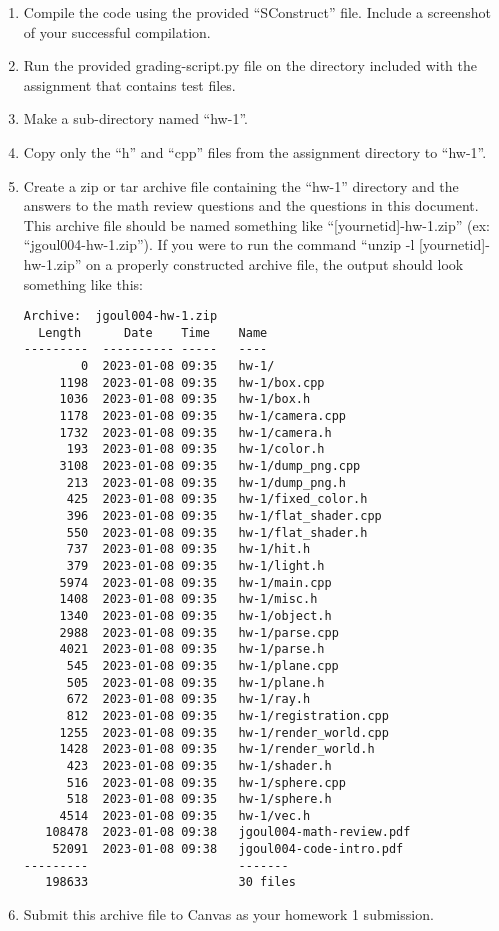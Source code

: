\documentclass[12pt]{article}
\begin{document}
\begin{enumerate}
\item Compile the code using the provided ``SConstruct'' file. Include a screenshot of your successful compilation.
\item Run the provided grading-script.py file on the directory included with the assignment that contains test files.
\item Make a sub-directory named ``hw-1''.
\item Copy only the ``h'' and ``cpp'' files from the assignment directory to ``hw-1''.
\item Create a zip or tar archive file containing the ``hw-1'' directory and the answers to the math review questions and the questions in this document. This archive file should be named something like ``[yournetid]-hw-1.zip'' (ex: ``jgoul004-hw-1.zip''). If you were to run the command ``unzip -l [yournetid]-hw-1.zip'' on a properly constructed archive file, the output should look something like this:
\begin{verbatim}
Archive:  jgoul004-hw-1.zip
  Length      Date    Time    Name
---------  ---------- -----   ----
        0  2023-01-08 09:35   hw-1/
     1198  2023-01-08 09:35   hw-1/box.cpp
     1036  2023-01-08 09:35   hw-1/box.h
     1178  2023-01-08 09:35   hw-1/camera.cpp
     1732  2023-01-08 09:35   hw-1/camera.h
      193  2023-01-08 09:35   hw-1/color.h
     3108  2023-01-08 09:35   hw-1/dump_png.cpp
      213  2023-01-08 09:35   hw-1/dump_png.h
      425  2023-01-08 09:35   hw-1/fixed_color.h
      396  2023-01-08 09:35   hw-1/flat_shader.cpp
      550  2023-01-08 09:35   hw-1/flat_shader.h
      737  2023-01-08 09:35   hw-1/hit.h
      379  2023-01-08 09:35   hw-1/light.h
     5974  2023-01-08 09:35   hw-1/main.cpp
     1408  2023-01-08 09:35   hw-1/misc.h
     1340  2023-01-08 09:35   hw-1/object.h
     2988  2023-01-08 09:35   hw-1/parse.cpp
     4021  2023-01-08 09:35   hw-1/parse.h
      545  2023-01-08 09:35   hw-1/plane.cpp
      505  2023-01-08 09:35   hw-1/plane.h
      672  2023-01-08 09:35   hw-1/ray.h
      812  2023-01-08 09:35   hw-1/registration.cpp
     1255  2023-01-08 09:35   hw-1/render_world.cpp
     1428  2023-01-08 09:35   hw-1/render_world.h
      423  2023-01-08 09:35   hw-1/shader.h
      516  2023-01-08 09:35   hw-1/sphere.cpp
      518  2023-01-08 09:35   hw-1/sphere.h
     4514  2023-01-08 09:35   hw-1/vec.h
   108478  2023-01-08 09:38   jgoul004-math-review.pdf
    52091  2023-01-08 09:38   jgoul004-code-intro.pdf
---------                     -------
   198633                     30 files
\end{verbatim}
\item Submit this archive file to Canvas as your homework 1 submission.
\end{enumerate}
\end{document}
